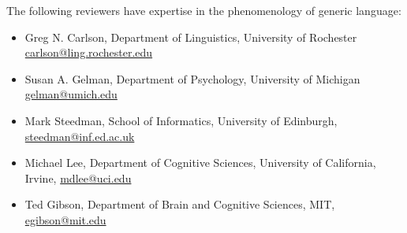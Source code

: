 \documentclass[11pt,stdletter,dateno,sigleft]{newlfm} %
\newcommand{\ndg}[1]{\textcolor{Green}{[ndg: #1]}}
\begin{document}
\begin{newlfm}
The following reviewers have expertise in the phenomenology of generic language:
\begin{itemize}
\item Greg N. Carlson, Department of Linguistics, University of Rochester \url{carlson@ling.rochester.edu}
\item Susan A. Gelman, Department of Psychology, University of Michigan \url{gelman@umich.edu}
\item Mark Steedman, School of Informatics, University of Edinburgh,  \url{steedman@inf.ed.ac.uk}
\item Michael Lee, Department of Cognitive Sciences, University of California, Irvine, \url{mdlee@uci.edu}
\item Ted Gibson, Department of Brain and Cognitive Sciences, MIT, \url{egibson@mit.edu}
\end{itemize}


%




\end{newlfm}
\end{document}
